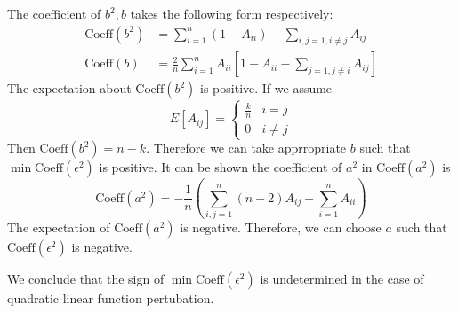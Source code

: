 \documentclass{article}
\begin{document}
The coefficient of $b^2, b$ takes the following form respectively:
\begin{align*}
\textrm{Coeff}(b^2) & = \sum_{i=1}^n (1-A_{ii}) - \sum_{i,j=1, i\neq j} A_{ij} \\
\textrm{Coeff}(b) & = \frac{2}{n}\sum_{i=1}^n A_{ii} [ 1 - A_{ii} - \sum_{j=1, j\neq i} A_{ij} ]
\end{align*}
The expectation about $\textrm{Coeff}(b^2)$ is positive. If  we assume
$$
E[A_{ij}]= \begin{cases}
\frac{k}{n} & i = j\\
0 & i\neq j 
\end{cases}
$$
Then $\textrm{Coeff}(b^2)  = n-k$. 
Therefore we can take apprropriate $b$ such that $\min \textrm{Coeff}(\epsilon^2)$ is positive.
It can be shown the coefficient of $a^2$ in $\textrm{Coeff}(a^2)$ is 
\begin{equation}
\textrm{Coeff}(a^2) = -\frac{1}{n}( \sum_{i,j=1}^n (n-2) A_{ij} + \sum_{i=1}^n A_{ii})
\end{equation}
The expectation of $\textrm{Coeff}(a^2)$ is negative. Therefore, we can choose $a$ such that $\textrm{Coeff}(\epsilon^2)$ is negative.

We conclude that the sign of $\min \textrm{Coeff}(\epsilon^2)$ is undetermined in the case of quadratic linear function pertubation.
\end{document}
